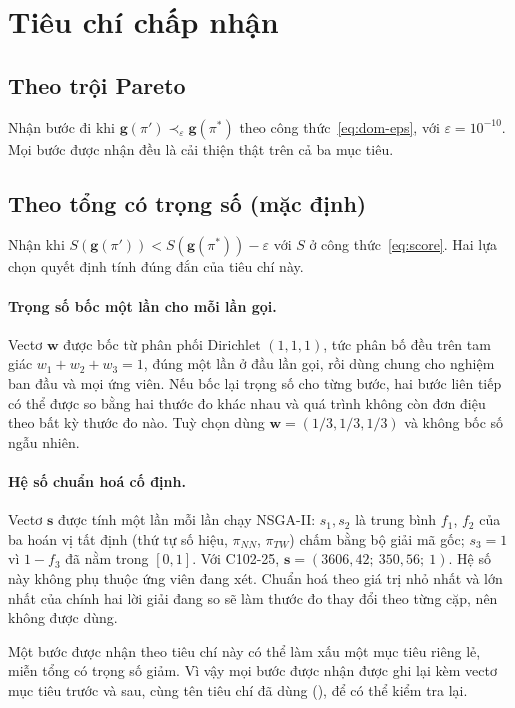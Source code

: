 \section{Tiêu chí chấp nhận}

\subsection{Theo trội Pareto}

Nhận bước đi khi $\mathbf{g}(\pi') \prec_\varepsilon \mathbf{g}(\pi^*)$ theo công thức~\ref{eq:dom-eps},
với $\varepsilon = 10^{-10}$. Mọi bước được nhận đều là cải thiện thật trên cả ba mục tiêu.

\subsection{Theo tổng có trọng số (mặc định)}

Nhận khi $S(\mathbf{g}(\pi')) < S(\mathbf{g}(\pi^*)) - \varepsilon$ với $S$ ở công thức~\ref{eq:score}.
Hai lựa chọn quyết định tính đúng đắn của tiêu chí này.

\paragraph{Trọng số bốc một lần cho mỗi lần gọi.} Vectơ $\mathbf{w}$ được bốc từ phân phối Dirichlet
$(1,1,1)$, tức phân bố đều trên tam giác $w_1 + w_2 + w_3 = 1$, đúng một lần ở đầu lần gọi, rồi dùng
chung cho nghiệm ban đầu và mọi ứng viên. Nếu bốc lại trọng số cho từng bước, hai bước liên tiếp có thể
được so bằng hai thước đo khác nhau và quá trình không còn đơn điệu theo bất kỳ thước đo nào. Tuỳ chọn
 dùng $\mathbf{w} = (1/3, 1/3, 1/3)$ và không bốc số ngẫu nhiên.

\paragraph{Hệ số chuẩn hoá cố định.} Vectơ $\mathbf{s}$ được tính một lần mỗi lần chạy NSGA-II:
$s_1, s_2$ là trung bình $f_1$, $f_2$ của ba hoán vị tất định (thứ tự số hiệu, $\pi_{NN}$, $\pi_{TW}$)
chấm bằng bộ giải mã gốc; $s_3 = 1$ vì $1 - f_3$ đã nằm trong $[0,1]$. Với C102-25,
$\mathbf{s} = (3606{,}42;\ 350{,}56;\ 1)$. Hệ số này không phụ thuộc ứng viên đang xét. Chuẩn hoá theo
giá trị nhỏ nhất và lớn nhất của chính hai lời giải đang so sẽ làm thước đo thay đổi theo từng cặp,
nên không được dùng.

Một bước được nhận theo tiêu chí này có thể làm xấu một mục tiêu riêng lẻ, miễn tổng có trọng số giảm.
Vì vậy mọi bước được nhận được ghi lại kèm vectơ mục tiêu trước và sau, cùng tên tiêu chí đã dùng
(), để có thể kiểm tra lại.

